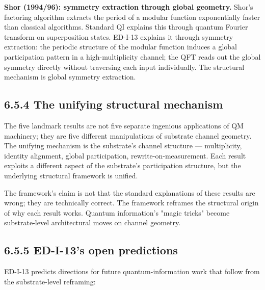 \documentclass[11pt]{book}
\begin{document}
\textbf{Shor (1994/96): symmetry extraction through global geometry.} Shor's factoring algorithm extracts the period of a modular function exponentially faster than classical algorithms. Standard QI explains this through quantum Fourier transform on superposition states. ED-I-13 explains it through symmetry extraction: the periodic structure of the modular function induces a global participation pattern in a high-multiplicity channel; the QFT reads out the global symmetry directly without traversing each input individually. The structural mechanism is global symmetry extraction.

\subsection{6.5.4 The unifying structural mechanism}

The five landmark results are not five separate ingenious applications of QM machinery; they are five different manipulations of substrate channel geometry. The unifying mechanism is the substrate's channel structure — multiplicity, identity alignment, global participation, rewrite-on-measurement. Each result exploits a different aspect of the substrate's participation structure, but the underlying structural framework is unified.

The framework's claim is not that the standard explanations of these results are wrong; they are technically correct. The framework reframes the structural origin of why each result works. Quantum information's "magic tricks" become substrate-level architectural moves on channel geometry.

\subsection{6.5.5 ED-I-13's open predictions}

ED-I-13 predicts directions for future quantum-information work that follow from the substrate-level reframing:
\end{document}

